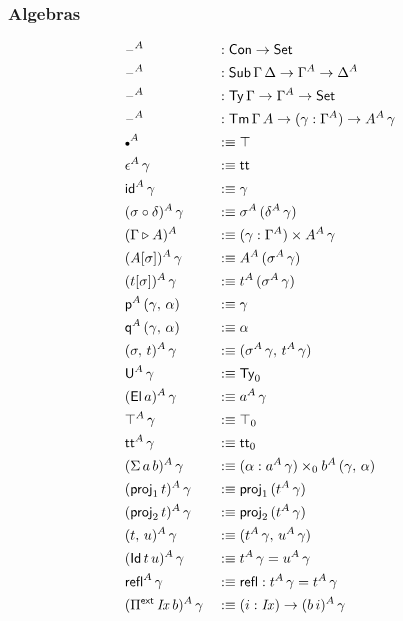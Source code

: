 \documentclass[12pt,a4paper,twoside,openany]{book}
\theoremstyle{remark}
\theoremstyle{definition}
\theoremstyle{theorem}
\newcommand{\mi}[1]{\mathit{#1}}
\newcommand{\refl}{\mathsf{refl}}
\newcommand{\id}{\mathsf{id}}
\newcommand{\Con}{\mathsf{Con}}
\newcommand{\Sub}{\mathsf{Sub}}
\newcommand{\Tm}{\mathsf{Tm}}
\newcommand{\Ty}{\mathsf{Ty}}
\newcommand{\U}{\mathsf{U}}
\newcommand{\El}{\mathsf{El}}
\newcommand{\Id}{\mathsf{Id}}
\newcommand{\proj}{\mathsf{proj}}
\renewcommand{\tt}{\mathsf{tt}}
\newcommand{\blank}{\mathord{\hspace{1pt}\text{--}\hspace{1pt}}}
\newcommand{\Set}{\mathsf{Set}}
\newcommand{\ext}{\triangleright}
\newcommand{\emptycon}{\scaleobj{.75}\bullet}
\newcommand{\Piinf}{\Pi^{\mathsf{ext}}}
\newcommand{\p}{\mathsf{p}}
\newcommand{\q}{\mathsf{q}}
\newcommand{\defn}{:\equiv}
\begin{document}
\subsubsection{Algebras}
\vspace{-0.5em}
\begin{alignat*}{3}
  &\blank^A &&: \Con \to \Set\\
  &\blank^A &&: \Sub\,\Gamma\,\Delta \to \Gamma^A \to \Delta^A\\
  &\blank^A &&: \Ty\,\Gamma \to \Gamma^A \to \Set\\
  &\blank^A &&: \Tm\,\Gamma\,A \to (\gamma : \Gamma^A) \to A^A\,\gamma\\
  &\emptycon^A &&\defn \top\\
  &\epsilon^A\,\gamma &&\defn \tt\\
  &\id^A\,\gamma &&\defn \gamma\\
  &(\sigma \circ \delta)^A\,\gamma &&\defn \sigma^A\,(\delta^A\,\gamma)\\
  &(\Gamma \ext A)^A &&\defn (\gamma : \Gamma^A) \times A^A\,\gamma\\
  &(A[\sigma])^A\,\gamma &&\defn A^A\,(\sigma^A\,\gamma)\\
  &(t[\sigma])^A\,\gamma &&\defn t^A\,(\sigma^A\,\gamma)\\
  &\p^A\,(\gamma,\,\alpha) &&\defn \gamma\\
  &\q^A\,(\gamma,\,\alpha) &&\defn \alpha\\
  &(\sigma,\,t)^A\,\gamma &&\defn (\sigma^A\,\gamma,\,t^A\,\gamma)\\
  &\U^A\,\gamma &&\defn \Ty_0\\
  &(\El\,a)^A\,\gamma &&\defn a^A\,\gamma\\
  &\top^A\,\gamma &&\defn \top_0\\
  &\tt^A\,\gamma &&\defn \tt_0\\
  &(\Sigma\,a\,b)^A\,\gamma &&\defn (\alpha : a^A\,\gamma) \times_0 b^A\,(\gamma,\,\alpha)\\
  &(\proj_1\,t)^A\,\gamma &&\defn \proj_1\,(t^A\,\gamma)\\
  &(\proj_2\,t)^A\,\gamma &&\defn \proj_2\,(t^A\,\gamma)\\
  &(t,\,u)^A\,\gamma &&\defn (t^A\,\gamma,\,u^A\,\gamma)\\
  &(\Id\,t\,u)^A\,\gamma &&\defn t^A\,\gamma = u^A\,\gamma\\
  &\refl^A\,\gamma &&\defn \refl : t^A\,\gamma = t^A\,\gamma\\
  &(\Piinf\,\mi{Ix}\,b)^A\,\gamma &&\defn (i : \mi{Ix}) \to (b\,i)^A\,\gamma\\

\end{alignat*}
\end{document}

